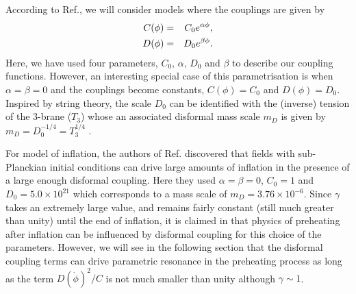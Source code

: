 \documentclass[aps,prd,amsmath,amssymb,preprintnumbers,onecolumn,11pt,nofootinbib]{revtex4}
\begin{document}
According to Ref.\cite{vandeBruck:2015tna}, we will consider models where the couplings are given by
\begin{eqnarray} \label{DC}
C(\phi) &=& C_{0} e^{\alpha \phi}, \cr
D(\phi) &=& D_{0} e^{\beta \phi}.
\end{eqnarray}
Here, we have used four parameters, $C_{0},\,\alpha,\,D_{0}$ and $\beta$ to describe our coupling functions.
However, an interesting special case of this parametrisation is when $\alpha=\beta=0$ and the couplings become constants, $C(\phi) = C_{0}$ and $D(\phi) = D_{0}$. Inspired by string theory, the scale $D_{0}$ can be identified with the (inverse) tension of the 3-brane ($T_{3}$) whose an associated disformal mass scale $m_{D}$ is given by $m_{D}=D^{-1/4}_{0}=T^{1/4}_{3}$ \cite{vandeBruck:2015tna}.

For model of inflation, the authors of Ref.\cite{vandeBruck:2015tna} discovered that fields with sub-Planckian initial conditions can drive large amounts of inflation in the presence of a large enough disformal coupling. Here they used $\alpha=\beta=0$, $C_{0} = 1$ and $D_{0}=5.0 \times 10^{21}$ which corresponds to a mass scale of $m_{D} = 3.76 \times 10^{-6}$.
Since $\gamma$ takes an extremely large value, and remains fairly constant (still much greater than unity) until the end of inflation, it is claimed in \cite{vandeBruck:2015tna} that physics of preheating after inflation can be influenced by disformal coupling for this choice of the parameters.
However, we will see in the following section that the disformal coupling terms can drive parametric resonance in the preheating process as long as the term $D (\dot\phi)^2 / C$ is not much smaller than unity although $\gamma \sim 1$.

\end{document}
